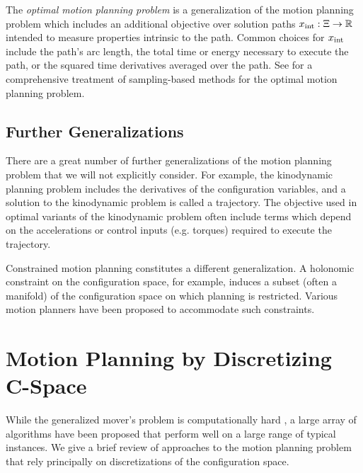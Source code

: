 The \emph{optimal motion planning problem}
is a generalization of the motion planning problem which
includes an additional objective over solution paths
$x_{\mbox{\scriptsize int}} : \Xi \rightarrow \mathbb{R}$
intended to measure properties intrinsic to the path.
Common choices for $x_{\mbox{\scriptsize int}}$ include
the path's arc length,
the total time or energy necessary to execute the path,
or the squared time derivatives averaged over the path.
See \citep{karaman2011samplingoptimal} for a comprehensive treatment
of sampling-based methods for the optimal motion planning problem.


\subsection{Further Generalizations}

There are a great number of further generalizations of the
motion planning problem that we will not explicitly consider.
For example,
the kinodynamic planning problem includes the derivatives of the
configuration variables,
and a solution to the kinodynamic problem is called a trajectory.
The objective used in optimal variants of the kinodynamic problem
often include terms which depend on the accelerations or control
inputs (e.g. torques)
required to execute the trajectory.

Constrained motion planning constitutes a different generalization.
A holonomic constraint on the configuration space,
for example,
induces a subset (often a manifold) of the configuration space
on which planning is restricted.
Various motion planners \citep{berenson2009manifolds}
have been proposed to accommodate such constraints.

\section{Motion Planning by Discretizing C-Space}

While the generalized mover's problem is computationally hard
\citep{reif1979moverscomplexity},
a large array of algorithms have been proposed that perform
well on a large range of typical instances.
We give a brief review of approaches to the motion planning problem
that rely principally on discretizations of the configuration space.

